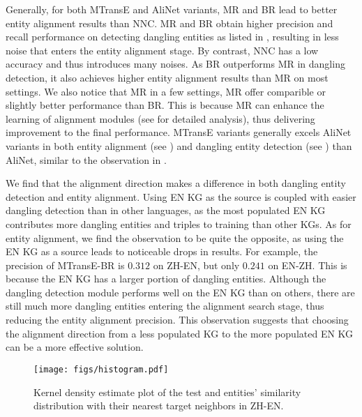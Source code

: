Generally, for both MTransE and AliNet variants, MR and BR lead to better entity alignment results than NNC. 
MR and BR obtain higher precision and recall performance on detecting dangling entities as listed in , resulting in less noise that enters the entity alignment stage.
By contrast, NNC has a low accuracy and thus introduces many noises.
As BR outperforms MR in dangling detection, it also achieves higher entity alignment results than MR on most settings.
We also notice that MR in a few settings, MR offer comparible or slightly better performance than BR.
This is because MR can enhance the learning of alignment modules (see  for detailed analysis), thus delivering improvement to the final performance. 
MTransE variants generally excels AliNet variants in both entity alignment (see ) and dangling entity detection (see ) than AliNet, similar to the observation in .

We find that the alignment direction makes a difference in both dangling entity detection and entity alignment. 
Using EN KG as the source is coupled with easier dangling detection than in other languages,
as the most populated EN KG contributes more dangling entities and triples to training than other KGs.
As for entity alignment, we find the observation to be quite the opposite, as using the EN KG as a source leads to noticeable drops in results.
For example, the precision of MTransE-BR is $0.312$ on ZH-EN, but only $0.241$ on EN-ZH.
This is because the EN KG has a larger portion of dangling entities. 
Although the dangling detection module performs well on the EN KG than on others, there are still much more dangling entities entering the alignment search stage, thus reducing the entity alignment precision.
This observation suggests that choosing the alignment direction from a less populated KG to the more populated EN KG can be a more effective solution.

\begin{figure}[t]
	\centering
	\texttt{[image: figs/histogram.pdf]}
	\caption{Kernel density estimate plot of the test {\color{blue}{matchable}} and {\color{red}{dangling}} entities' similarity distribution with their nearest target neighbors in ZH-EN.}
	\label{fig:viz}
\end{figure}

